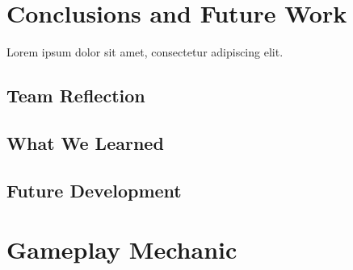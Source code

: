 \documentclass[conference]{IEEEtran}
\begin{document}
\section{Conclusions and Future Work}

Lorem ipsum dolor sit amet, consectetur adipiscing elit.

\subsection{Team Reflection}

\subsection{What We Learned}

\subsection{Future Development}

\appendices%
\section{Gameplay Mechanic}\label{app:gameplay}




\end{document}
